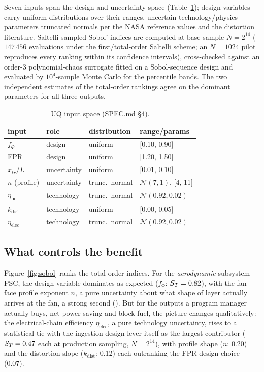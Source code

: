 \documentclass[10pt]{article}
\begin{document}
Seven inputs span the design and uncertainty space (Table~\ref{tab:inputs});
design variables carry uniform distributions over their ranges, uncertain
technology/physics parameters truncated normals per the NASA reference
values and the distortion literature. Saltelli-sampled Sobol' indices
\citep{sobol2001, saltelli2010, herman2017} are computed at base sample
$N=2^{14}$ ($147\,456$ evaluations under the first/total-order Saltelli
scheme; an $N=1024$ pilot reproduces every
ranking within its confidence intervals), cross-checked against an order-3
polynomial-chaos surrogate \citep{feinberg2015} fitted on a Sobol-sequence
design and evaluated by $10^4$-sample Monte Carlo for the percentile
bands. The two independent estimates of the total-order
rankings agree on the dominant parameters for all three outputs.

\begin{table}[t]
\centering\small
\caption{UQ input space (SPEC.md \S4).}
\label{tab:inputs}
\begin{tabular}{llll}
\toprule
input & role & distribution & range/params \\
\midrule
$f_\Phi$ & design & uniform & [0.10, 0.90] \\
FPR & design & uniform & [1.20, 1.50] \\
$x_{tr}/L$ & uncertainty & uniform & [0.01, 0.10] \\
$n$ (profile) & uncertainty & trunc.\ normal & $\mathcal N(7,1)$, [4, 11] \\
$\eta_{\mathrm{pol}}$ & technology & trunc.\ normal & $\mathcal N(0.92, 0.02)$ \\
$k_{\mathrm{dist}}$ & technology & uniform & [0.00, 0.05] \\
$\eta_{\mathrm{elec}}$ & technology & trunc.\ normal & $\mathcal N(0.92, 0.02)$ \\
\bottomrule
\end{tabular}
\end{table}

\subsection{What controls the benefit}

Figure~\ref{fig:sobol} ranks the total-order indices. For the
\emph{aerodynamic} subsystem PSC, the design variable dominates as expected
($f_\Phi$: $S_T=0.82$), with the fan-face profile exponent
$n$, a pure uncertainty about what shape of layer actually arrives at
the fan, a strong second (\numSobolAeroSecondVal). But for the outputs a
program manager actually buys, net power saving and block fuel, the
picture changes qualitatively: the electrical-chain efficiency
$\eta_{\mathrm{elec}}$, a pure technology uncertainty, rises to a
statistical tie with the ingestion design lever itself as the largest
contributor ($S_T=0.47$ each at production sampling,
$N=2^{14}$), with profile shape ($n$: 0.20) and the distortion slope
($k_{\mathrm{dist}}$: 0.12) each outranking the FPR design choice (0.07).
\end{document}
